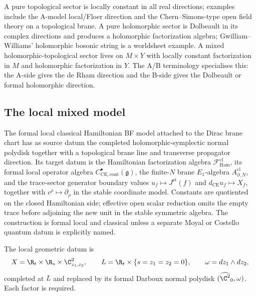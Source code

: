 \documentclass[11pt]{memoir}
\begin{document}
A pure topological sector is locally constant in all real directions;
examples include the A-model local/Floer direction and the
Chern--Simons-type open field theory on a topological brane.  A pure
holomorphic sector is Dolbeault in its complex directions and produces
a holomorphic factorization algebra; Gwilliam--Williams' holomorphic
bosonic string is a worldsheet example.  A mixed
holomorphic-topological sector lives on \(M\times Y\) with locally
constant factorization in \(M\) and holomorphic factorization in
\(Y\).  The A/B terminology specialises this: the A-side gives the
de Rham direction and the B-side gives the Dolbeault or formal
holomorphic direction.

\subsection{The local mixed model}

The formal local classical Hamiltonian BF model attached to the Dirac
brane chart has as source datum the completed holomorphic-symplectic
normal polydisk together with a topological brane line and transverse
propagator direction.  Its target datum is the Hamiltonian factorization algebra
\(\mathcal F^{\mathrm{cl}}_{\mathrm{Ham}}\), its formal local operator
algebra \(C^\bullet_{\mathrm{CE},\mathrm{cont}}(\mathfrak g)\), the
finite-\(N\) brane \(E_1\)-algebra
\(A^{\mathrm{cl}}_{\partial,N}\), and the trace-sector generator
boundary values \(u_f\mapsto J^{\mathrm{st}}(f)\) and
\(d_{\mathrm{CE}}u_f\mapsto X_f\), together with
\(c^\rho\mapsto\partial_\rho\) in the stable coordinate model.
Constants are quotiented on the closed Hamiltonian side; effective open
scalar reduction omits the empty trace before adjoining the new unit in
the stable symmetric algebra.  The construction
is formal local and classical unless a separate Moyal or Costello
quantum datum is explicitly named.

The local geometric datum is
\[
  X=\R_t\times\R_s\times\C^2_{z_1,z_2},
  \qquad
  L=\R_t\times\{s=z_1=z_2=0\},
  \qquad \omega=dz_1\wedge dz_2,
\]
completed at \(L\) and replaced by its formal Darboux normal polydisk
\((\widehat{\C^2}_0,\omega)\).  Each factor is required.
\end{document}
